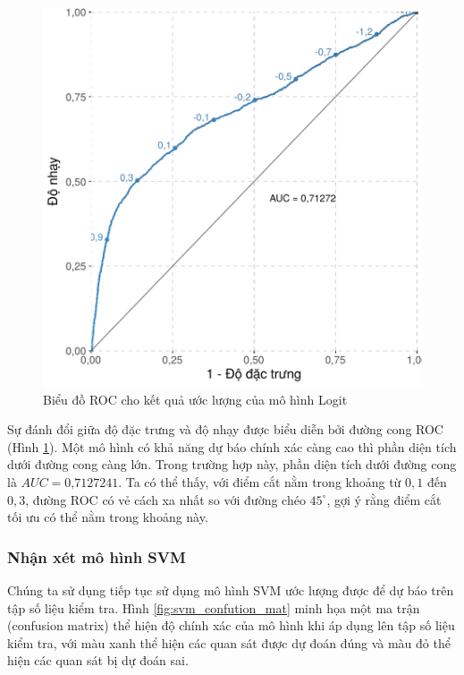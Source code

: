 \documentclass[a4paper]{report}\usepackage[]{graphicx}\usepackage[]{color}
\newenvironment{knitrout}{}{} %
\begin{document}
\begin{figure}[h]
\centering
\capstart
\begin{knitrout}\small
{}\color{fgcolor}
\includegraphics[width=12cm]{Figures/lasso_roc-1} 

\end{knitrout}
\caption{Biểu đồ ROC cho kết quả ước lượng của mô hình Logit}
\label{fig:lasso_roc}
\end{figure}

Sự đánh đổi giữa độ đặc trưng và độ nhạy được biểu diễn bởi đường cong ROC (Hình \ref{fig:lasso_roc}). Một mô hình có khả năng dự báo chính xác càng cao thì phần diện tích dưới đường cong càng lớn. Trong trường hợp này, phần diện tích dưới đường cong là $AUC = \text{0,7127241}$. Ta có thể thấy, với điểm cắt nằm trong khoảng từ $0,1$ đến $0,3$, đường ROC có vẻ cách xa nhất so với đường chéo $45^\circ$, gợi ý rằng điểm cắt tối ưu có thể nằm trong khoảng này.


\subsubsection{Nhận xét mô hình SVM}
Chúng ta sử dụng tiếp tục sử dụng mô hình SVM ước lượng được để dự báo trên tập số liệu kiểm tra. Hình \ref{fig:svm_confution_mat} minh họa một ma trận (confusion matrix) thể hiện độ chính xác của mô hình khi áp dụng lên tập số liệu kiểm tra, với màu xanh thể hiện các quan sát được dự đoán đúng và màu đỏ thể hiện các quan sát bị dự đoán sai.
\end{document}
